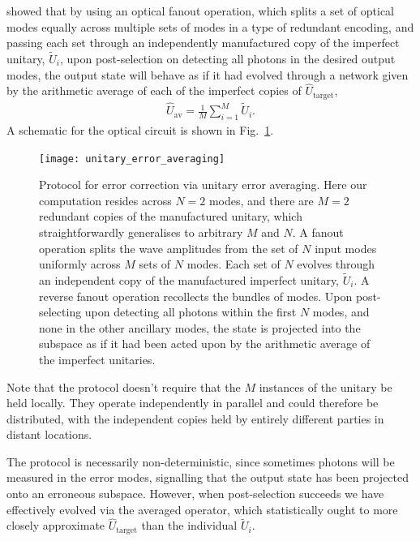 \cite{MarshmanLundRohdeRalph} showed that by using an optical fanout operation, which splits a set of optical modes equally across multiple sets of modes in a type of redundant encoding, and passing each set through an independently manufactured copy of the imperfect unitary, $\tilde{U}_i$, upon post-selection on detecting all photons in the desired output modes, the output state will behave as if it had evolved through a network given by the arithmetic average of each of the imperfect copies of $\hat{U}_\mathrm{target}$,
\begin{align}
\hat{U}_\mathrm{av} = \frac{1}{M}\sum_{i=1}^M \tilde{U}_i.	
\end{align}
A schematic for the optical circuit is shown in Fig.~\ref{fig:error_av_circuit}.

\begin{figure}[htpb]
\texttt{[image: unitary\_error\_averaging]}
\caption{Protocol for error correction via unitary error averaging. Here our computation resides across \mbox{$N=2$} modes, and there are \mbox{$M=2$} redundant copies of the manufactured unitary, which straightforwardly generalises to arbitrary $M$ and $N$. A fanout operation splits the wave amplitudes from the set of $N$ input modes uniformly across $M$ sets of $N$ modes. Each set of $N$ evolves through an independent copy of the manufactured imperfect unitary, $\tilde{U}_i$. A reverse fanout operation recollects the bundles of modes. Upon post-selecting upon detecting all photons within the first $N$ modes, and none in the other ancillary modes, the state is projected into the subspace as if it had been acted upon by the arithmetic average of the imperfect unitaries.} \label{fig:error_av_circuit}	
\end{figure}

Note that the protocol doesn't require that the $M$ instances of the unitary be held locally. They operate independently in parallel and could therefore be distributed, with the independent copies held by entirely different parties in distant locations.

The protocol is necessarily non-deterministic, since sometimes photons will be measured in the error modes, signalling that the output state has been projected onto an erroneous subspace. However, when post-selection succeeds we have effectively evolved via the averaged operator, which statistically ought to more closely approximate $\hat{U}_\mathrm{target}$ than the individual $\tilde{U}_i$.

